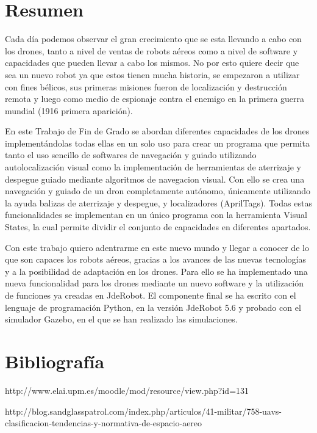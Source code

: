 \documentclass[a4paper, 12pt, oneside]{book}
\begin{document}
\chapter*{Resumen}
\hspace{1cm} Cada día podemos observar el gran crecimiento que se esta llevando a cabo con los drones, tanto a nivel de ventas de robots aéreos como a nivel de software y capacidades que pueden llevar a cabo los mismos. No por esto quiere decir que sea un nuevo robot ya que estos tienen mucha historia, se empezaron a utilizar con fines bélicos, sus primeras misiones fueron de localización y destrucción remota y luego como medio de espionaje contra el enemigo en la primera guerra mundial (1916 primera aparición).

\hspace{1cm} En este Trabajo de Fin de Grado se abordan diferentes capacidades de los drones implementándolas todas ellas en un solo uso para crear un programa que permita tanto el uso sencillo de softwares de navegación y guiado utilizando autolocalización visual como la implementación de herramientas de aterrizaje y despegue guiado mediante algoritmos de navegacion visual. Con ello se crea una navegación y guiado de un dron completamente autónomo, únicamente utilizando la ayuda balizas de aterrizaje y despegue, y localizadores (AprilTags). Todas estas funcionalidades se implementan en un único programa con la herramienta Visual States, la cual permite dividir el conjunto de capacidades en diferentes apartados.

\hspace{1cm} Con este trabajo quiero adentrarme en este nuevo mundo y llegar a conocer de lo que son capaces los robots aéreos, gracias a los avances de las nuevas tecnologías y a la posibilidad de adaptación en los drones. Para ello se ha implementado una nueva funcionalidad para los drones mediante un nuevo software y la utilización de funciones ya creadas en JdeRobot. El componente final se ha escrito con el lenguaje de programación Python, en la versión JdeRobot 5.6 y probado con el simulador Gazebo, en el que se han realizado las simulaciones.

\renewcommand{\tablename}{Tabla}
\tableofcontents %

\listoffigures %
\cleardoublepage

\pagestyle{fancy}
\setlength{\parindent}{6mm}








\chapter{Bibliografía}
http://www.elai.upm.es/moodle/mod/resource/view.php?id=131

http://blog.sandglasspatrol.com/index.php/articulos/41-militar/758-uavs-clasificacion-tendencias-y-normativa-de-espacio-aereo
\end{document}
